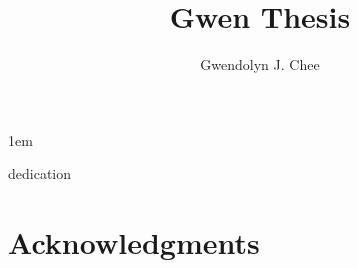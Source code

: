 \documentclass[edeposit,fullpage,12pt]{uiucthesis2009}
\title{Gwen Thesis}
\author{Gwendolyn J. Chee}
\begin{document}

%
\maketitle
\justify
\parindent 1em%

\frontmatter

%
\begin{abstract}

\end{abstract}

%
\begin{dedication}
dedication
\end{dedication}

%
\chapter*{Acknowledgments}
																																			
%
\tableofcontents

%
\listoftables

%
\listoffigures

%

\end{document}
